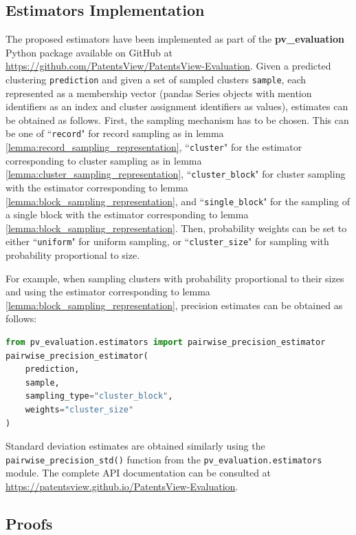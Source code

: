 \documentclass[fontsize=11pt]{article}
\newcommand{\ob}[1]{{#1}}
\theoremstyle{definition}
\begin{document}
\subsection{Estimators Implementation}\label{sec:implementation}

\ob{The proposed estimators have been implemented as part of the \textbf{pv\_evaluation} Python package available on GitHub at \url{https://github.com/PatentsView/PatentsView-Evaluation}. Given a predicted clustering \texttt{prediction} and given a set of sampled clusters \texttt{sample}, each represented as a membership vector (pandas Series objects with mention identifiers as an index and cluster assignment identifiers as values), estimates can be obtained as follows. First, the sampling mechanism has to be chosen. This can be one of ``\texttt{record}" for record sampling as in lemma \ref{lemma:record_sampling_representation}, ``\texttt{cluster}" for the estimator corresponding to cluster sampling as in lemma \ref{lemma:cluster_sampling_representation}, ``\texttt{cluster\_block}" for cluster sampling with the estimator corresponding to lemma \ref{lemma:block_sampling_representation}, and ``\texttt{single\_block}" for the sampling of a single block with the estimator corresponding to lemma \ref{lemma:block_sampling_representation}. Then, probability weights can be set to either ``\texttt{uniform}" for uniform sampling, or ``\texttt{cluster\_size}" for sampling with probability proportional to size.}

\ob{For example, when sampling clusters with probability proportional to their sizes and using the estimator corresponding to lemma \ref{lemma:block_sampling_representation}, precision estimates can be obtained as follows:}
\begin{lstlisting}[language=Python]
from pv_evaluation.estimators import pairwise_precision_estimator
pairwise_precision_estimator(
    prediction, 
    sample, 
    sampling_type="cluster_block", 
    weights="cluster_size"
)
\end{lstlisting}
\ob{Standard deviation estimates are obtained similarly using the \texttt{pairwise\_precision\_std()} function from the \texttt{pv\_evaluation.estimators} module. The complete API documentation can be consulted at \url{https://patentsview.github.io/PatentsView-Evaluation}.}


\subsection{Proofs}\label{appendix:proofs}
\end{document}
